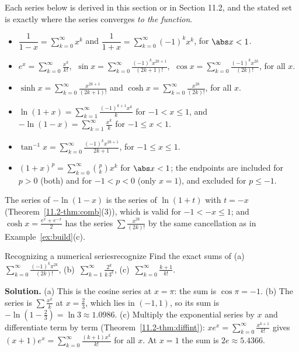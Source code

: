 \documentclass[11pt]{article}
\begin{document}
\begin{remark}
Each series below is derived in this section or in Section 11.2, and the stated set is exactly where the series converges \emph{to the function}.
\begin{itemize}[nosep]
  \item $\dfrac1{1-x}=\displaystyle\sum_{k=0}^\infty x^k$ and $\dfrac1{1+x}=\displaystyle\sum_{k=0}^\infty(-1)^kx^k$, for $\abs x<1$.
  \item $e^x=\displaystyle\sum_{k=0}^\infty\frac{x^k}{k!}$, $\ \sin x=\displaystyle\sum_{k=0}^\infty\frac{(-1)^kx^{2k+1}}{(2k+1)!}$, $\ \cos x=\displaystyle\sum_{k=0}^\infty\frac{(-1)^kx^{2k}}{(2k)!}$, for all $x$.
  \item $\sinh x=\displaystyle\sum_{k=0}^\infty\frac{x^{2k+1}}{(2k+1)!}$ and $\cosh x=\displaystyle\sum_{k=0}^\infty\frac{x^{2k}}{(2k)!}$, for all $x$.
  \item $\ln(1+x)=\displaystyle\sum_{k=1}^\infty\frac{(-1)^{k+1}x^k}k$ for $-1<x\le1$, and $-\ln(1-x)=\displaystyle\sum_{k=1}^\infty\frac{x^k}k$ for $-1\le x<1$.
  \item $\tan^{-1}x=\displaystyle\sum_{k=0}^\infty\frac{(-1)^kx^{2k+1}}{2k+1}$, for $-1\le x\le1$.
  \item $(1+x)^p=\displaystyle\sum_{k=0}^\infty\binom pkx^k$ for $\abs x<1$; the endpoints are included for $p>0$ (both) and for $-1<p<0$ (only $x=1$), and excluded for $p\le-1$.
\end{itemize}
\end{remark}

The series of $-\ln(1-x)$ is the series of $\ln(1+t)$ with $t=-x$ (Theorem~\ref{11.2-thm:comb}(3)), which is valid for $-1<-x\le1$; and $\cosh x=\frac{e^x+e^{-x}}2$ has the series $\sum\frac{x^{2k}}{(2k)!}$ by the same cancellation as in Example~\ref{ex:build}(c).

\begin{exmp}{Recognizing a numerical series}{recognize}
Find the exact sums of (a)~$\displaystyle\sum_{k=0}^\infty\frac{(-1)^k\pi^{2k}}{(2k)!}$, (b)~$\displaystyle\sum_{k=1}^\infty\frac{2^k}{k\,3^k}$, (c)~$\displaystyle\sum_{k=0}^\infty\frac{k+1}{k!}$.

\textbf{Solution.} (a) This is the cosine series at $x=\pi$: the sum is $\cos\pi=-1$. (b) The series is $\sum\frac{x^k}k$ at $x=\frac23$, which lies in $(-1,1)$, so its sum is $-\ln\left(1-\frac23\right)=\ln3\approx1.0986$. (c) Multiply the exponential series by $x$ and differentiate term by term (Theorem~\ref{11.2-thm:diffint}): $xe^x=\sum_{k=0}^\infty\frac{x^{k+1}}{k!}$ gives $(x+1)e^x=\sum_{k=0}^\infty\frac{(k+1)x^k}{k!}$ for all $x$. At $x=1$ the sum is $2e\approx5.4366$.
\end{exmp}
\end{document}
